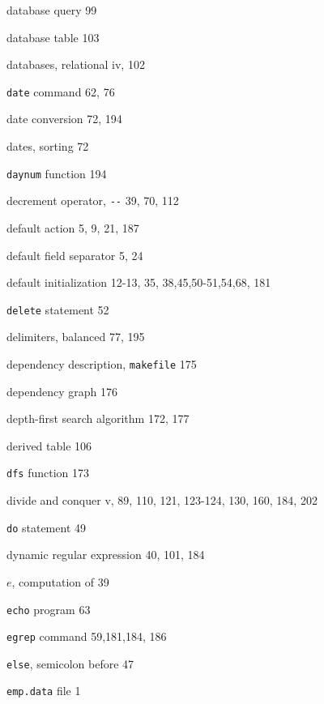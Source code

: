 \begin{multicols}{3}
\hangindent=3pc  database query 99

\hangindent=3pc  database table 103

\hangindent=3pc  databases, relational iv, 102


\hangindent=3pc  \verb'date' command 62, 76

\hangindent=3pc  date conversion 72, 194

\hangindent=3pc  dates, sorting 72

\hangindent=3pc  \verb'daynum' function 194

\hangindent=3pc  decrement operator, \verb'--' 39, 70, 112

\hangindent=3pc  default action 5, 9, 21, 187

\hangindent=3pc  default field separator 5, 24

\hangindent=3pc  default initialization 12-13, 35, 38,45,50-51,54,68, 181

\hangindent=3pc  \verb'delete' statement 52

\hangindent=3pc  delimiters, balanced 77, 195

\hangindent=3pc  dependency description, \verb'makefile' 175

\hangindent=3pc  dependency graph 176

\hangindent=3pc  depth-first search algorithm 172, 177

\hangindent=3pc  derived table 106

\hangindent=3pc  \verb'dfs' function 173

\hangindent=3pc  divide and conquer v, 89, 110, 121, 123-124, 130, 160, 184, 202

\hangindent=3pc  \verb'do' statement 49

\hangindent=3pc  dynamic regular expression 40,  101, 184

\hangindent=3pc  $e$, computation of 39

\hangindent=3pc  \verb'echo' program 63

\hangindent=3pc  \verb'egrep' command 59,181,184, 186

\hangindent=3pc  \verb'else', semicolon before 47

\hangindent=3pc  \verb'emp.data' file 1


\end{multicols}
